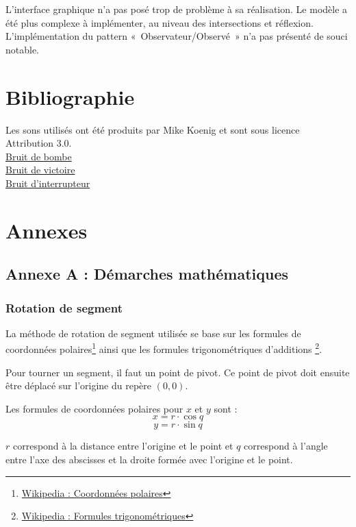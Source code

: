 \documentclass[]{report}
\begin{document}
L’interface graphique n’a pas posé trop de problème à sa réalisation. Le modèle a été plus complexe à implémenter, au niveau des intersections et réflexion. L’implémentation du pattern «~Observateur/Observé~» n’a pas présenté de souci notable.

\section{Bibliographie}

Les sons utilisés ont été produits par Mike Koenig et sont sous licence Attribution 3.0.\\

\href{http://soundbible.com/106-Car-Explosion.html}{Bruit de bombe}   \\
\href{http://soundbible.com/1003-Ta-Da.html}{Bruit de victoire}       \\
\href{http://soundbible.com/761-Switch.html}{Bruit d’interrupteur}    \\

\newpage
\section{\label{Annexe}Annexes}

\subsection{Annexe A : Démarches mathématiques}

\subsubsection{\label{AnnexeRotation}Rotation de segment}

La méthode de rotation de segment utilisée se base sur les formules
de coordonnées polaires\footnote{\href{http://fr.wikipedia.org/wiki/Coordonn\%C3\%A9es\_polaires}{Wikipedia : Coordonnées polaires}}
ainsi que les formules trigonométriques d'additions
\footnote{\href{http://fr.wikipedia.org/wiki/Trigonom\%C3\%A9trie}{Wikipedia : Formules trigonométriques}}.

Pour tourner un segment, il faut un point de pivot. Ce point de pivot
doit ensuite être déplacé sur l'origine du repère $ (0, 0) $.

Les formules de coordonnées polaires pour $ x $ et $ y $ sont :
$$ x = r \cdot \cos{q} $$ 
$$ y = r \cdot \sin{q} $$

$ r $ correspond à la distance entre l'origine et le point et $ q $ correspond 
à l'angle entre l'axe des abscisses et la droite formée avec l'origine et le point.
\end{document}
